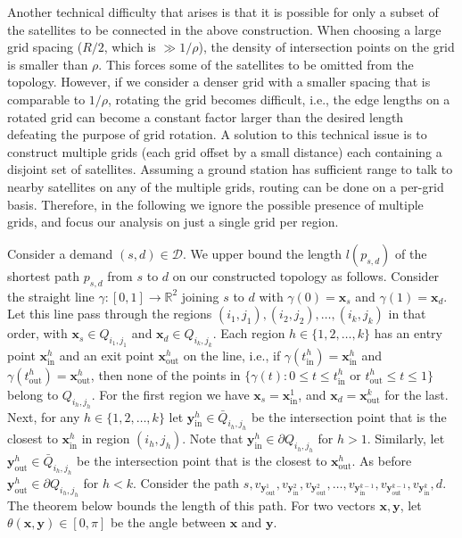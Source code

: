 \documentclass[acmsmall, screen]{acmart}
\begin{document}
Another technical difficulty that arises is that it is possible for only a subset of the satellites to be connected in the above construction. 
When choosing a large grid spacing ($R/2$, which is  $\gg 1/\rho$), the density of intersection points on the grid is smaller than $\rho$. 
This forces some of the satellites to be omitted from the topology. 
However, if we consider a denser grid with a smaller spacing that is comparable to $1/\rho$, rotating the grid becomes difficult, i.e., the edge lengths on a rotated grid can become a constant factor larger than the desired length defeating the purpose of grid rotation.
A solution to this technical issue is to construct multiple grids (each grid offset by a small distance) each containing a disjoint set of satellites. 
Assuming a ground station has sufficient range to talk to nearby satellites on any of the multiple grids, routing can be done on a per-grid basis. 
Therefore, in the following we ignore the possible presence of multiple grids, and focus our analysis on just a single grid per region.    

Consider a demand $(s,d) \in \mathcal{D}$.
We upper bound the length $l(p_{s,d})$ of the shortest path $p_{s,d}$ from $s$ to $d$ on our constructed topology as follows. 
Consider the straight line $\gamma:[0,1] \rightarrow \mathbb{R}^2$ joining $s$ to $d$ with $\gamma(0) = \mathbf{x}_s$ and $\gamma(1) = \mathbf{x}_d$. 
Let this line pass through the regions $(i_1, j_1), (i_2, j_2), \ldots, (i_k, j_k)$ in that order, with $\mathbf{x}_s \in Q_{i_1, j_1}$ and $\mathbf{x}_d \in Q_{i_k, j_k}$. 
Each region $h \in \{1, 2, \ldots, k\}$ has an entry point $\mathbf{x}^h_\mathrm{in}$ and an exit point $\mathbf{x}^h_\mathrm{out}$ on the line, i.e., if $\gamma(t^h_\mathrm{in}) = \mathbf{x}^h_\mathrm{in}$ and $\gamma(t^h_\mathrm{out}) = \mathbf{x}^h_\mathrm{out}$, then none of the points in $\{ \gamma(t): 0 \leq t \leq t^h_\mathrm{in} \text{ or } t^h_\mathrm{out} \leq t \leq 1 \}$ belong to $Q_{i_h, j_h}$.  
For the first region we have $\mathbf{x}_s = \mathbf{x}^1_\mathrm{in}$, and $\mathbf{x}_d = \mathbf{x}^k_\mathrm{out}$ for the last. 
Next, for any $h \in \{1, 2, \ldots, k\}$ let $\mathbf{y}^h_\mathrm{in} \in \bar{Q}_{i_h, j_h}$ be the intersection point that is the closest to $\mathbf{x}^h_\mathrm{in}$ in region $(i_h, j_h)$.  
Note that $\mathbf{y}^h_\mathrm{in} \in \partial Q_{i_h, j_h}$ for $h>1$.  
Similarly, let $\mathbf{y}^h_\mathrm{out} \in \bar{Q}_{i_h, j_h}$ be the intersection point that is the closest to $\mathbf{x}^h_\mathrm{out}$. 
As before $\mathbf{y}^h_\mathrm{out} \in \partial Q_{i_h, j_h}$ for $h < k$. 
Consider the path $s, v_{\mathbf{y}^1_\mathrm{out}}, v_{\mathbf{y}^2_\mathrm{in}}, v_{\mathbf{y}^2_\mathrm{out}}, \ldots, v_{\mathbf{y}^{k-1}_\mathrm{in}}, v_{\mathbf{y}^{k-1}_\mathrm{out}}, v_{\mathbf{y}^{k}_\mathrm{in}}, d$.
The theorem below bounds the length of this path. 
For two vectors $\mathbf{x}, \mathbf{y}$, let $\theta(\mathbf{x}, \mathbf{y}) \in [0, \pi]$ be the angle between $\mathbf{x}$ and $\mathbf{y}$. 
\end{document}
